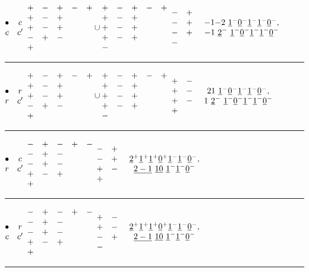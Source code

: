 \documentclass[11pt ,reqno]{amsart}
\begin{document}
\medskip
$\begin{matrix} \bullet&c\\ c&c'\end{matrix}$\qquad  
$\begin{matrix} +&-&+&-&+\\ +&-&+&&\\+&-&+&&\\-&+&-&&\\+&&&&\end{matrix}\cup
\begin{matrix} +&-&+&-&+\\ +&-&+&&\\+&-&+&&\\+&-&+&&\\-&&&&\end{matrix}$
\qquad $\begin{matrix} -&+\\-&+\\-&+\\-&&\end{matrix}$
\qquad $\mat{-1}{-2}\ \ul{1}^-\ul{0}^-\ul{1}^-\ul{1}^-\ul{0}^-,\\
{-1}\ \ul{2}^-\ \ul{1}^-\ul{0}^-\ul{1}^-\ul{1}^-\ul{0}^-\emat$
\hfill
\medskip
\hrule
\medskip
$\begin{matrix} \bullet&r\\ r&c'\end{matrix}$\qquad  
$\begin{matrix} +&-&+&-&+\\ +&-&+&&\\+&-&+&&\\-&+&-&&\\+&&&&\end{matrix}\cup
\begin{matrix} +&-&+&-&+\\ +&-&+&&\\+&-&+&&\\+&-&+&&\\-&&&&\end{matrix}$
\qquad $\begin{matrix} +&-\\+&-\\+&-\\+&&\end{matrix}$
\qquad $\mat{2}{1}\ \ul{1}^-\ul{0}^-\ul{1}^-\ul{1}^-\ul{0}^-,\\
{1\ }\ul{2}^-\ \ul{1}^-\ul{0}^-\ul{1}^-\ul{1}^-\ul{0}^-\emat$
\hfill
\medskip
\hrule
\medskip
$\begin{matrix} \bullet&c\\ r&c'\end{matrix}$\qquad  
$\begin{matrix} -&+&-&+&-\\ -&+&-&&\\-&+&-&&\\+&-&+&&\\+&&&&\end{matrix}$
\qquad $\begin{matrix} -&+\\-&+\\+&-\\+&&\end{matrix}$
\qquad $\begin{matrix}{\underline{2}}^+{\underline{1}}^+{\underline{1}}^+{\underline{0}}^+{\underline{1}}^-{\underline{1}}^-{\underline{0}}^-,\\
{\underline{2-1}}\ {\underline{10}}\ {\underline{1}}^-{\underline{1}}^-{\underline{0}}^-\end{matrix}$
\hfill
\medskip
\hrule
\medskip
$\begin{matrix} \bullet&r\\ c&c'\end{matrix}$\qquad  
$\begin{matrix} -&+&-&+&-\\ -&+&-&&\\-&+&-&&\\+&-&+&&\\+&&&&\end{matrix}$
\qquad $\begin{matrix} +&-\\+&-\\-&+\\-&&\end{matrix}$
\qquad $\begin{matrix}{\underline{2}}^+{\underline{1}}^+{\underline{1}}^+{\underline{0}}^+{\underline{1}}^-{\underline{1}}^-{\underline{0}}^-,\\
{\underline{2-1}}\ {\underline{10}}\ {\underline{1}}^-{\underline{1}}^-{\underline{0}}^-\end{matrix}$
\hfill
\medskip
\hrule
\end{document}
